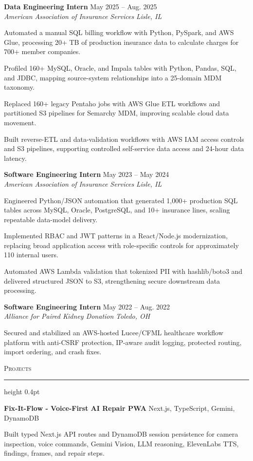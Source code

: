 \documentclass[letterpaper,11pt]{article}
\newcommand{\resumesection}[1]{%
  \par\vspace{2pt}%
  {\large\scshape #1}\par\vspace{2pt}%
  \hrule height 0.4pt\vspace{2pt}%
}
\newcommand{\resumeSubheading}[4]{
  \textbf{#1} \hfill #2\\
  \textit{#3} \hfill \textit{#4}
}
\newcommand{\projectHeading}[2]{
  \textbf{#1} \hfill #2
}
\begin{document}
\resumeSubheading
{Data Engineering Intern}{May 2025 -- Aug. 2025}
{American Association of Insurance Services}{Lisle, IL}
\begin{tightitemize}
  \item Automated a manual SQL billing workflow with Python, PySpark, and AWS Glue, processing 20+ TB of production insurance data to calculate charges for 700+ member companies.
  \item Profiled 160+ MySQL, Oracle, and Impala tables with Python, Pandas, SQL, and JDBC, mapping source-system relationships into a 25-domain MDM taxonomy.
  \item Replaced 160+ legacy Pentaho jobs with AWS Glue ETL workflows and partitioned S3 pipelines for Semarchy MDM, improving scalable cloud data movement.
  \item Built reverse-ETL and data-validation workflows with AWS IAM access controls and S3 pipelines, supporting controlled self-service data access and 24-hour data latency.
\end{tightitemize}

\resumeSubheading
{Software Engineering Intern}{May 2023 -- May 2024}
{American Association of Insurance Services}{Lisle, IL}
\begin{tightitemize}
  \item Engineered Python/JSON automation that generated 1,000+ production SQL tables across MySQL, Oracle, PostgreSQL, and 10+ insurance lines, scaling repeatable data-model delivery.
  \item Implemented RBAC and JWT patterns in a React/Node.js modernization, replacing broad application access with role-specific controls for approximately 110 internal users.
  \item Automated AWS Lambda validation that tokenized PII with hashlib/boto3 and delivered structured JSON to S3, strengthening secure downstream data processing.
\end{tightitemize}

\resumeSubheading
{Software Engineering Intern}{May 2022 -- Aug. 2022}
{Alliance for Paired Kidney Donation}{Toledo, OH}
\begin{tightitemize}
  \item Secured and stabilized an AWS-hosted Lucee/CFML healthcare workflow platform with anti-CSRF protection, IP-aware audit logging, protected routing, import ordering, and crash fixes.
\end{tightitemize}

\resumesection{Projects}
\projectHeading{Fix-It-Flow - Voice-First AI Repair PWA}{Next.js, TypeScript, Gemini, DynamoDB}
\begin{tightitemize}
  \item Built typed Next.js API routes and DynamoDB session persistence for camera inspection, voice commands, Gemini Vision, LLM reasoning, ElevenLabs TTS, findings, frames, and repair steps.
\end{tightitemize}
\end{document}
